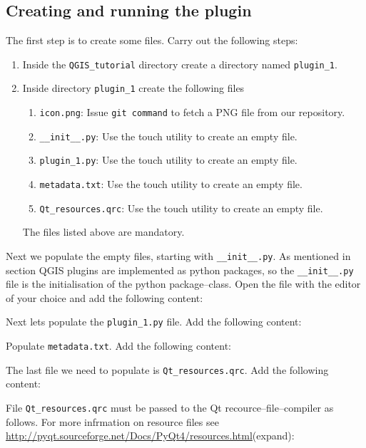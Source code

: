 \subsection{Creating and running the plugin}
\label{ssect:creating_plugin_1}
\par %
The first step is to create some files. Carry out the following steps:
\begin{enumerate}
  \item Inside the \lstinline{QGIS_tutorial} directory create a directory named \lstinline{plugin_1}.
  \item Inside directory \lstinline{plugin_1} create the following files
  \begin{enumerate}
    \item \lstinline{icon.png}: Issue \lstinline{git command} to fetch a PNG file from our repository.
    \item \lstinline{__init__.py}: Use the touch utility to create an empty file.
    \item \lstinline{plugin_1.py}: Use the touch utility to create an empty file.
    \item \lstinline{metadata.txt}: Use the touch utility to create an empty file.
    \item \lstinline{Qt_resources.qrc}: Use the touch utility to create an empty file.
  \end{enumerate}
  The files listed above are mandatory.
\end{enumerate}
Next we populate the empty files, starting with \lstinline{__init__.py}. As mentioned in section \label{sect:introduction} QGIS plugins are implemented as python packages, so the \lstinline{__init__.py} file is the initialisation of the python package--class. Open the file with the editor of your choice and add the following content:

\par%
Next lets populate the \lstinline{plugin_1.py} file. Add the following content:

\par%
Populate \lstinline{metadata.txt}. Add the following content:

\par%
The last file we need to populate is \lstinline{Qt_resources.qrc}. Add the following content:

File \lstinline{Qt_resources.qrc} must be passed to the Qt recource--file--compiler as follows. For more infrmation on resource files see \url{http://pyqt.sourceforge.net/Docs/PyQt4/resources.html}(expand):
